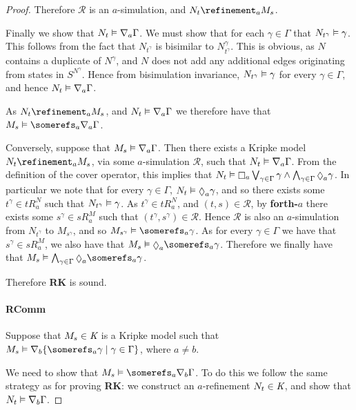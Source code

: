 \begin{proof}
Therefore $\mathcal{R}$ is an $a$-simulation, and $N_t \refinement_a M_s$.

Finally we show that $N_t \vDash \nabla_a \Gamma$. We must show that for each
$\gamma \in \Gamma$ that $N_{t^\gamma} \vDash \gamma$. This follows from the
fact that $N_{t^\gamma}$ is bisimilar to $N^\gamma_{t^\gamma}$. This is obvious,
as $N$ contains a duplicate of $N^\gamma$, and $N$ does not add any additional
edges originating from states in $S^{N^\gamma}$. Hence from bisimulation
invariance, $N_{t^\gamma} \vDash \gamma$ for every $\gamma \in \Gamma$, and
hence $N_t \vDash \nabla_a \Gamma$.

As $N_t \refinement_a M_s$, and $N_t \vDash \nabla_a \Gamma$ we therefore
have that $M_s \entails \somerefs_a \covers_a \Gamma$.

Conversely, suppose that $M_s \vDash \nabla_a \Gamma$. Then there exists a
Kripke model $N_t \refinement_a M_s$, via some $a$-simulation $\mathcal{R}$,
such that $N_t \vDash \nabla_a \Gamma$. From the definition of the cover
operator, this implies that $N_t \entails \knows_a \bigvee_{\gamma \in \Gamma}
\gamma \land \bigwedge_{\gamma \in \Gamma} \suspects_a \gamma$. In particular we
note that for every $\gamma \in \Gamma$, $N_t \entails \suspects_a \gamma$, and
so there exists some $t^\gamma \in tR^N_a$ such that $N_{t^\gamma} \vDash
\gamma$. As $t^\gamma \in tR^N_a$, and $(t, s) \in \mathcal{R}$, by {\bf
forth-$a$} there exists some $s^\gamma \in sR^M_a$ such that $(t^\gamma, s^\gamma)
\in \mathcal{R}$. Hence $\mathcal{R}$ is also an $a$-simulation from
$N_{t^\gamma}$ to $M_{s^\gamma}$, and so $M_{s^\gamma} \entails \somerefs_a
\gamma$. As for every $\gamma \in \Gamma$ we have that $s^\gamma \in sR^M_a$, we
also have that $M_s \entails \suspects_a \somerefs_a \gamma$. Therefore we
finally have that $M_s \entails \bigwedge_{\gamma \in \Gamma} \suspects_a
\somerefs_a \gamma$.

Therefore {\bf RK} is sound.

\paragraph{RComm}
Suppose that $M_s \in \textit{K}$ is a Kripke model such that $M_s \entails
\covers_b \{ \somerefs_a \gamma \mid \gamma \in \Gamma\}$, where $a \neq b$.

We need to show that $M_s \entails \somerefs_a \covers_b \Gamma$. To do this we
follow the same strategy as for proving {\bf RK}: we construct an $a$-refinement
$N_t \in \textit{K}$, and show that $N_t \vDash \nabla_b \Gamma$.


\end{proof}
